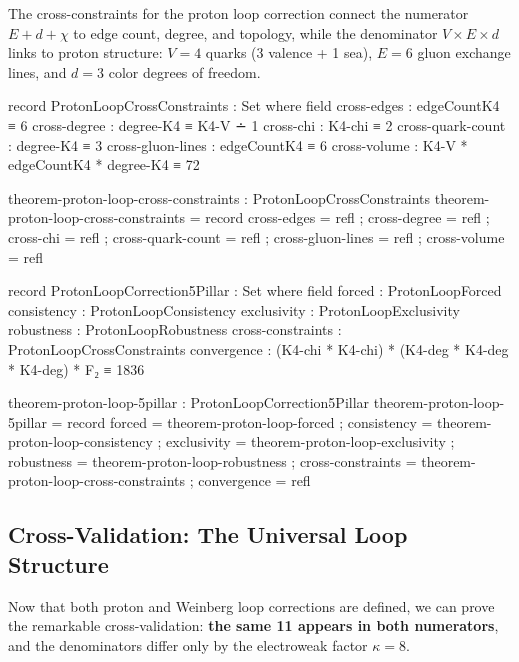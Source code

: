 \documentclass[11pt,a4paper]{book}
\begin{document}
The cross-constraints for the proton loop correction connect the numerator $E + d + \chi$ 
to edge count, degree, and topology, while the denominator $V \times E \times d$ links 
to proton structure: $V = 4$ quarks (3 valence + 1 sea), $E = 6$ gluon exchange lines, 
and $d = 3$ color degrees of freedom.

\begin{code}
record ProtonLoopCrossConstraints : Set where
  field
    cross-edges : edgeCountK4 ≡ 6
    cross-degree : degree-K4 ≡ K4-V ∸ 1
    cross-chi : K4-chi ≡ 2
    cross-quark-count : degree-K4 ≡ 3
    cross-gluon-lines : edgeCountK4 ≡ 6
    cross-volume : K4-V * edgeCountK4 * degree-K4 ≡ 72

theorem-proton-loop-cross-constraints : ProtonLoopCrossConstraints
theorem-proton-loop-cross-constraints = record
  { cross-edges = refl
  ; cross-degree = refl
  ; cross-chi = refl
  ; cross-quark-count = refl
  ; cross-gluon-lines = refl
  ; cross-volume = refl
  }

record ProtonLoopCorrection5Pillar : Set where
  field
    forced : ProtonLoopForced
    consistency : ProtonLoopConsistency
    exclusivity : ProtonLoopExclusivity
    robustness : ProtonLoopRobustness
    cross-constraints : ProtonLoopCrossConstraints
    convergence : (K4-chi * K4-chi) * (K4-deg * K4-deg * K4-deg) * F₂ ≡ 1836

theorem-proton-loop-5pillar : ProtonLoopCorrection5Pillar
theorem-proton-loop-5pillar = record
  { forced = theorem-proton-loop-forced
  ; consistency = theorem-proton-loop-consistency
  ; exclusivity = theorem-proton-loop-exclusivity
  ; robustness = theorem-proton-loop-robustness
  ; cross-constraints = theorem-proton-loop-cross-constraints
  ; convergence = refl
  }
\end{code}

\subsection{Cross-Validation: The Universal Loop Structure}

Now that both proton and Weinberg loop corrections are defined, we can prove the remarkable cross-validation: \textbf{the same 11 appears in both numerators}, and the denominators differ only by the electroweak factor $\kappa = 8$.
\end{document}
